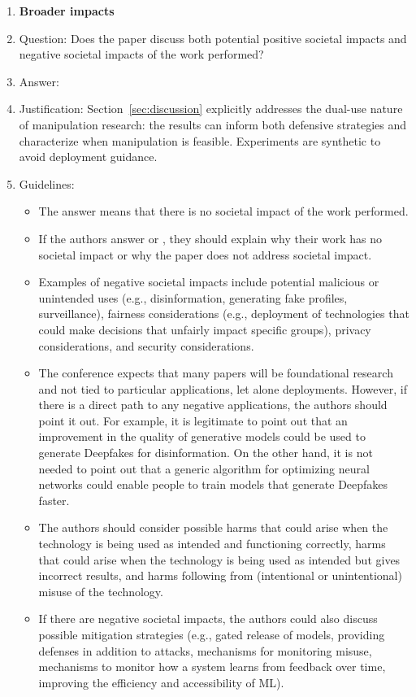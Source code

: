 \documentclass{article}
\begin{document}
\begin{enumerate}
\item {\bf Broader impacts}
    \item[] Question: Does the paper discuss both potential positive societal impacts and negative societal impacts of the work performed?
    \item[] Answer: \answerYes{}
    \item[] Justification: Section~\ref{sec:discussion} explicitly addresses the dual-use nature of manipulation research: the results can inform both defensive strategies and characterize when manipulation is feasible. Experiments are synthetic to avoid deployment guidance.
    \item[] Guidelines:
    \begin{itemize}
        \item The answer \answerNA{} means that there is no societal impact of the work performed.
        \item If the authors answer \answerNA{} or \answerNo, they should explain why their work has no societal impact or why the paper does not address societal impact.
        \item Examples of negative societal impacts include potential malicious or unintended uses (e.g., disinformation, generating fake profiles, surveillance), fairness considerations (e.g., deployment of technologies that could make decisions that unfairly impact specific groups), privacy considerations, and security considerations.
        \item The conference expects that many papers will be foundational research and not tied to particular applications, let alone deployments. However, if there is a direct path to any negative applications, the authors should point it out. For example, it is legitimate to point out that an improvement in the quality of generative models could be used to generate Deepfakes for disinformation. On the other hand, it is not needed to point out that a generic algorithm for optimizing neural networks could enable people to train models that generate Deepfakes faster.
        \item The authors should consider possible harms that could arise when the technology is being used as intended and functioning correctly, harms that could arise when the technology is being used as intended but gives incorrect results, and harms following from (intentional or unintentional) misuse of the technology.
        \item If there are negative societal impacts, the authors could also discuss possible mitigation strategies (e.g., gated release of models, providing defenses in addition to attacks, mechanisms for monitoring misuse, mechanisms to monitor how a system learns from feedback over time, improving the efficiency and accessibility of ML).
    \end{itemize}
   

\end{enumerate}
\end{document}
